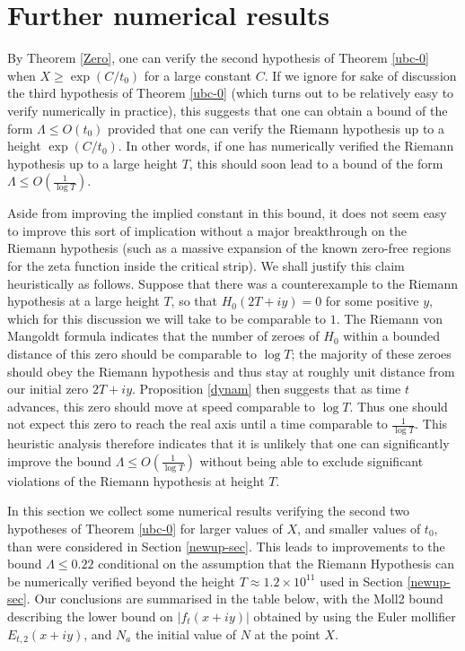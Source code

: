 \section{Further numerical results}\label{further-sec}

By Theorem \ref{Zero}, one can verify the second hypothesis of Theorem \ref{ubc-0} when $X \geq \exp(C/t_0)$ for a large constant $C$.  If we ignore for sake of discussion the third hypothesis of Theorem \ref{ubc-0} (which turns out to be relatively easy to verify numerically in practice), this suggests that one can obtain a bound of the form $\Lambda \leq O(t_0)$ provided that one can verify the Riemann hypothesis up to a height $\exp(C/t_0)$.  In other words, if one has numerically verified the Riemann hypothesis up to a large height $T$, this should soon lead to a bound of the form $\Lambda \leq O \left( \frac{1}{\log T} \right )$.

Aside from improving the implied constant in this bound, it does not seem easy to improve this sort of implication without a major breakthrough on the Riemann hypothesis (such as a massive expansion of the known zero-free regions for the zeta function inside the critical strip).  We shall justify this claim heuristically as follows. Suppose that there was a counterexample to the Riemann hypothesis at a large height $T$, so that $H_0(2T + iy) = 0$ for some positive $y$, which for this discussion we will take to be comparable to $1$.  The Riemann von Mangoldt formula indicates that the number of zeroes of $H_0$ within a bounded distance of this zero should be comparable to $\log T$; the majority of these zeroes should obey the Riemann hypothesis and thus stay at roughly unit distance from our initial zero $2T+iy$.  Proposition \ref{dynam} then suggests that as time $t$ advances, this zero should move at speed comparable to $\log T$.  Thus one should not expect this zero to reach the real axis until a time comparable to $\frac{1}{\log T}$.  This heuristic analysis therefore indicates that it is unlikely that one can significantly improve the bound $\Lambda \leq O \left( \frac{1}{\log T} \right )$ without being able to exclude significant violations of the Riemann hypothesis at height $T$.

In this section we collect some numerical results verifying the second two hypotheses of Theorem \ref{ubc-0} for larger values of $X$, and smaller values of $t_0$, than were considered in Section \ref{newup-sec}.  This leads to improvements to the bound $\Lambda \leq 0.22$ conditional on the assumption that the Riemann Hypothesis can be numerically verified beyond the height $T \approx 1.2 \times 10^{11}$ used in Section \ref{newup-sec}.  Our conclusions are summarised in the table below, with the Moll2 bound describing the lower bound on $|f_t(x+iy)|$ obtained by using the Euler mollifier $E_{t,2}(x+iy)$, and $N_a$ the initial value of $N$ at the point $X$.

